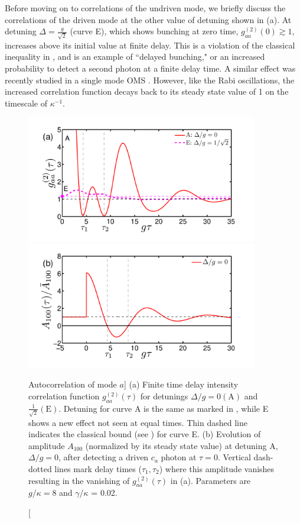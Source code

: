 Before moving on to correlations of the undriven mode,
we briefly discuss the correlations of the driven mode at the
 other value of  detuning shown in 
(a).
 At detuning
$\Delta = \frac{g}{\sqrt{2}}$ (curve E),
which shows bunching at zero time,
$g^{(2)}_{aa}(0) \gtrsim 1$, 
increases  above its initial value at
finite delay.
This is a violation of the classical inequality in
, 
and is an example of ``delayed bunching,"
or an increased probability to detect a second
photon at a finite delay time.
A similar effect was recently studied
in a single mode OMS \cite{Kronwald2012}.
However, like the Rabi oscillations,
the increased correlation function decays back to its steady state
value of 1 on
the timescale of $\kappa^{-1}$.
\begin{figure} 
\centering
  \includegraphics[width=0.9\textwidth]{./figs_Komar2013/fig5a.pdf}\\[-0.5cm]
  \includegraphics[width=0.9\textwidth]{./figs_Komar2013/fig5b.pdf}
  \caption
  [Autocorrelation of mode $a$]
  {
  \label{fig:g2aatau}
  (a) Finite time delay intensity
  correlation function $g^{(2)}_{aa}(\tau)$  for detunings
  $\Delta/g = 0 \mathrm{ (A)}$ and $\frac{1}{\sqrt{2}}
  \mathrm{ (E)}$.
  Detuning for curve A is the same as marked in ,
  while E shows a new effect not seen at equal times.
  Thin dashed line indicates the classical bound 
  (see ) for curve E. 
  (b) Evolution of amplitude $A_{100}$ (normalized by its
  steady state value)
  at detuning A, $\Delta/g = 0$,
  after detecting a driven $c_a$ photon at $\tau = 0$. 
  Vertical dash-dotted lines mark delay times ($\tau_1, \tau_2$) where this amplitude
  vanishes resulting in the vanishing of $g^{(2)}_{aa}(\tau)$
  in (a).
  Parameters are $g/\kappa = 8$ and $\gamma/\kappa$ = 0.02. 
  } 
\end{figure}
